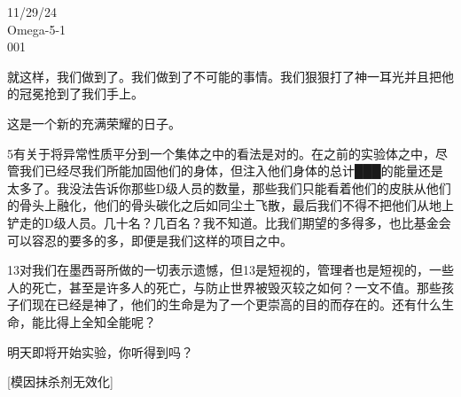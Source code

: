 


\begin{scpbox}

11/29/24 \\
Omega-5-1 \\
001

就这样，我们做到了。我们做到了不可能的事情。我们狠狠打了神一耳光并且把他的冠冕抢到了我们手上。

这是一个新的充满荣耀的日子。

5有关于将异常性质平分到一个集体之中的看法是对的。在之前的实验体之中，尽管我们已经尽我们所能加固他们的身体，但注入他们身体的总计███的能量还是太多了。我没法告诉你那些D级人员的数量，那些我们只能看着他们的皮肤从他们的骨头上融化，他们的骨头碳化之后如同尘土飞散，最后我们不得不把他们从地上铲走的D级人员。几十名？几百名？我不知道。比我们期望的多得多，也比基金会可以容忍的要多的多，即便是我们这样的项目之中。

13对我们在墨西哥所做的一切表示遗憾，但13是短视的，管理者也是短视的，一些人的死亡，甚至是许多人的死亡，与防止世界被毁灭较之如何？一文不值。那些孩子们现在已经是神了，他们的生命是为了一个更崇高的目的而存在的。还有什么生命，能比得上全知全能呢？

明天即将开始实验，你听得到吗？

\end{scpbox}




\begin{scpboxc}
{[模因抹杀剂无效化]}
\end{scpboxc}

